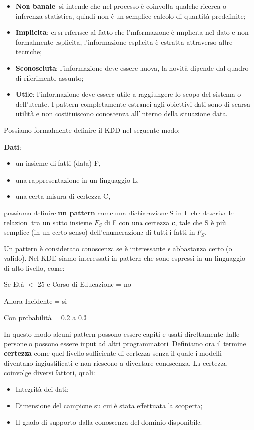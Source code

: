 \documentclass[a4paper]{extarticle}
\begin{document}
\begin{itemize}
    \item \textbf{Non banale}: si intende che nel processo è coinvolta qualche ricerca o inferenza statistica, quindi non è un semplice calcolo di quantità predefinite;
    \item \textbf{Implicita}: ci si riferisce al fatto che l'informazione è implicita nel dato e non formalmente esplicita, l'informazione esplicita è estratta attraverso altre tecniche;
    \item \textbf{Sconosciuta}: l'informazione deve essere nuova, la novità dipende dal quadro di riferimento assunto;
    \item \textbf{Utile}: l'informazione deve essere utile a raggiungere lo scopo del sistema o dell'utente. I pattern completamente estranei agli obiettivi dati sono di scarsa utilità e non costituiscono conoscenza all'interno della situazione data.
\end{itemize}

Possiamo formalmente definire il KDD nel seguente modo:

\textbf{Dati}:
\begin{itemize}
	\item un insieme di fatti (data) F,
	\item una rappresentazione in un linguaggio L,
	\item una certa misura di certezza C,
\end{itemize}
possiamo definire \textbf{un pattern} come una dichiarazione S in L che descrive le relazioni tra un sotto insieme $F_{S}$ di F con una certezza \textbf{\textit{c}}, tale che S è più semplice (in un certo senso) dell'enumerazione di tutti i fatti in $F_S$.

Un pattern è considerato conoscenza se è interessante e abbastanza certo (o valido). Nel KDD siamo interessati in pattern che sono espressi in un linguaggio di alto livello, come:
\newpage
\begin{center}
Se Età $<$ 25 e Corso-di-Educazione = no

Allora Incidente = si

Con probabilità = 0.2 a 0.3
\end{center}
In questo modo alcuni pattern possono essere capiti e usati direttamente dalle persone o possono essere input ad altri programmatori.
Definiamo ora il termine \textbf{certezza} come quel livello sufficiente di certezza senza il quale i modelli diventano ingiustificati e non riescono a diventare conoscenza. La certezza coinvolge diversi fattori, quali: 
\begin{itemize}
	\item Integrità dei dati;
	\item Dimensione del campione su cui è stata effettuata la scoperta;
	\item Il grado di supporto dalla conoscenza del dominio disponibile.
\end{itemize}
\end{document}
